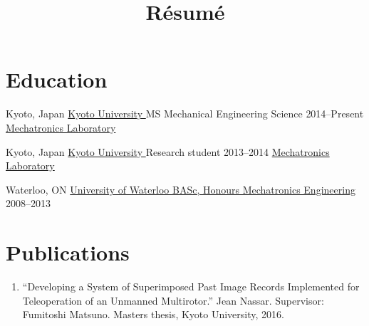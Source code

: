 \documentclass[10pt, letterpaper]{moderncv}
\title{Résumé}
\begin{document}

\makecvtitle
\vspace{-20pt}






\section{Education}
    \begin{samepage}
      \cventry
          {Kyoto, Japan}
          {\href{http://kyoto-u.ac.jp}{%
             Kyoto University%
}}
          {%
             MS Mechanical Engineering Science%
}
          {2014--Present}
          {%
\href{www.mechatronics.me.kyoto-u.ac.jp}{%
               Mechatronics Laboratory%
}%
%
          }
        {}
    \end{samepage}
    \begin{samepage}
      \cventry
          {Kyoto, Japan}
          {\href{http://kyoto-u.ac.jp}{%
             Kyoto University%
}}
          {%
             Research student%
}
          {2013--2014}
          {%
\href{www.mechatronics.me.kyoto-u.ac.jp}{%
               Mechatronics Laboratory%
}%
%
          }
        {}
    \end{samepage}
    \begin{samepage}
      \cventry
          {Waterloo, ON}
          {\href{http://www.uwaterloo.ca}{%
             University of Waterloo%
}}
          {\href{https://uwaterloo.ca/mechanical-mechatronics/engineering/program-overview}{%
             BASc, Honours Mechatronics Engineering%
}}
          {2008--2013}
          {%
          }
        {}
    \end{samepage}


\section{Publications}
  \begin{enumerate}
      \item{
          ``Developing a System of Superimposed Past Image Records Implemented for Teleoperation of an Unmanned Multirotor.''
        Jean Nassar. Supervisor: Fumitoshi Matsuno.
        Masters thesis, 
        Kyoto University,
        2016.
      }
  \end{enumerate}
\end{document}
